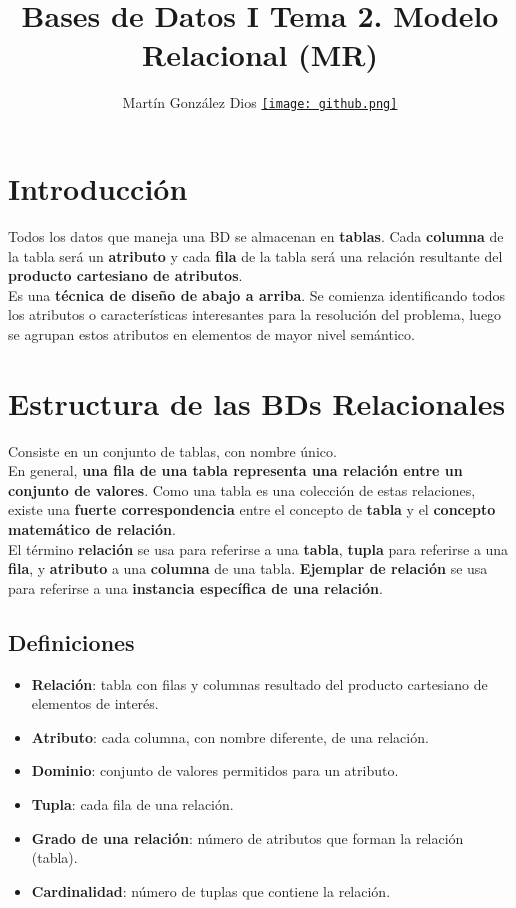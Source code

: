 \documentclass{article}
\title{Bases de Datos I Tema 2. Modelo Relacional (MR)}
\author{Martín González Dios 
\href{https://github.com/martindios}{\texttt{[image: github.png]}}}
\begin{document}
\maketitle

\section{Introducción}
Todos los datos que maneja una BD se almacenan en \textbf{tablas}. Cada \textbf{columna} de la tabla será un \textbf{atributo} y cada \textbf{fila} de la tabla será una relación resultante del \textbf{producto cartesiano de atributos}. \\

Es una \textbf{técnica de diseño de abajo a arriba}. Se comienza identificando todos los atributos o características interesantes para la resolución del problema, luego se agrupan estos atributos en elementos de mayor nivel semántico.

\section{Estructura de las BDs Relacionales}
Consiste en un conjunto de tablas, con nombre único. \\
En general, \textbf{una fila de una tabla representa una relación entre un conjunto de valores}. Como una tabla es una colección de estas relaciones, existe una \textbf{fuerte correspondencia} entre el concepto de \textbf{tabla} y el \textbf{concepto matemático de relación}. \\

El término \textbf{relación} se usa para referirse a una \textbf{tabla}, \textbf{tupla} para referirse a una \textbf{fila}, y \textbf{atributo} a una \textbf{columna} de una tabla. \textbf{Ejemplar de relación} se usa para referirse a una \textbf{instancia específica de una relación}. \\

\subsection{Definiciones}
\begin{itemize}
    \item \textbf{Relación}: tabla con filas y columnas resultado del producto cartesiano de elementos de interés.

    \item \textbf{Atributo}: cada columna, con nombre diferente, de una relación.

    \item \textbf{Dominio}: conjunto de valores permitidos para un atributo.

    \item \textbf{Tupla}: cada fila de una relación.

    \item \textbf{Grado de una relación}: número de atributos que forman la relación (tabla).

    \item \textbf{Cardinalidad}: número de tuplas que contiene la relación.
\end{itemize}
\end{document}

